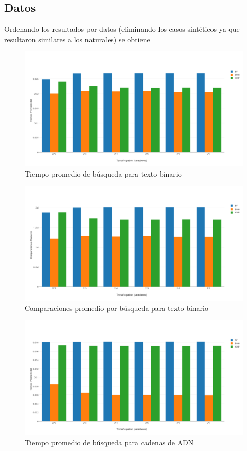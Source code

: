 \documentclass[14pt,letterpaper,hidelinks]{extarticle}
\begin{document}
	\subsection{Datos}
	Ordenando los resultados por datos (eliminando los casos sintéticos ya que resultaron similares a los naturales) se obtiene
		\begin{figure}[ht!]
			\centering
			\includegraphics[scale=0.5]{img/tBINA.pdf}
			\caption{Tiempo promedio de búsqueda para texto binario} \label{construccion}
		\end{figure}
			\newpage
		\begin{figure}[ht!]
			\centering
			\includegraphics[scale=0.5]{img/cBINA.pdf}
			\caption{Comparaciones promedio por búsqueda para texto binario} \label{construccion}
		\end{figure}
	\newpage
		\begin{figure}[ht!]
			\centering
			\includegraphics[scale=0.5]{img/tRDNA.pdf}
			\caption{Tiempo promedio de búsqueda para cadenas de ADN} \label{construccion}
		\end{figure}
\end{document}
